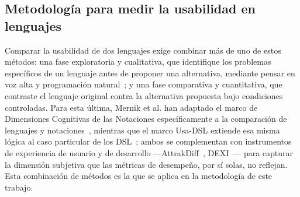 \subsection{Metodología para medir la usabilidad en lenguajes}

Comparar la usabilidad de dos lenguajes exige combinar más de uno de estos métodos: una fase exploratoria y cualitativa, que identifique los problemas específicos de un lenguaje antes de proponer una alternativa, mediante pensar en voz alta y programación natural~\cite{PDFThinkAloud,paneStudyingLanguageStructure2001}; y una fase comparativa y cuantitativa, que contraste el lenguaje original contra la alternativa propuesta bajo condiciones controladas. Para esta última, Mernik et al. han adaptado el marco de Dimensiones Cognitivas de las Notaciones específicamente a la comparación de lenguajes y notaciones~\cite{mernikPDFComparisonXAML2009}, mientras que el marco Usa-DSL extiende esa misma lógica al caso particular de los DSL~\cite{Poltronieri2018}; ambos se complementan con instrumentos de experiencia de usuario y de desarrollo ---AttrakDiff~\cite{PDFNeedsAffect}, DEXI~\cite{Kuusinen2016}--- para capturar la dimensión subjetiva que las métricas de desempeño, por sí solas, no reflejan. Esta combinación de métodos es la que se aplica en la metodología de este trabajo.

